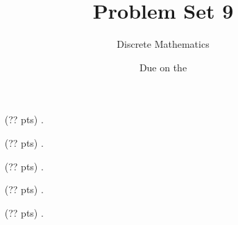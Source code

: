 

\title{Problem Set 9}
\author[Daniel Gonzalez Cedre]{Discrete Mathematics}
\date{Due on the }



\maketitle

\begin{enumerate}
  \item[(?? pts) \quad 1.]

  \item[(?? pts) \quad 2.]

  \item[(?? pts) \quad 3.]

  \item[(?? pts) \quad 4.]

  \item[(?? pts) \quad 5.]

\end{enumerate}


